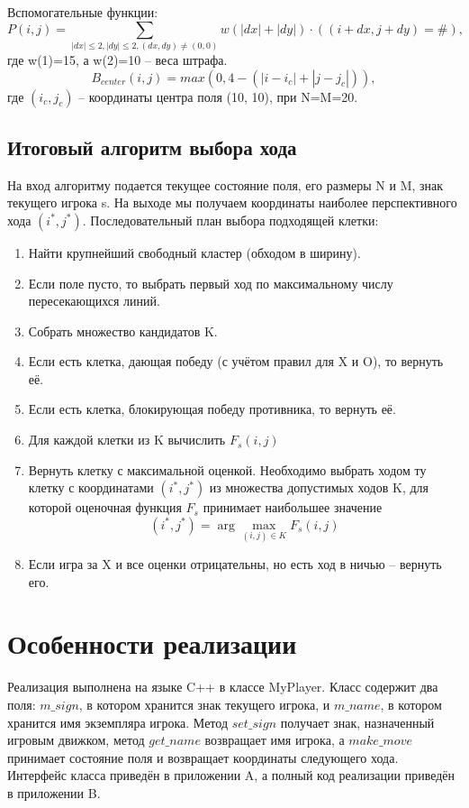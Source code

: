 \documentclass[14pt]{extreport}
\begin{document}
Вспомогательные функции:
\[ P(i, j) = \sum_{|dx| \leq 2, |dy| \leq 2, (dx, dy) \neq (0, 0)}w(|dx| + |dy|) \cdot ((i+dx, j+dy) = \#),\]
где w(1)=15, а w(2)=10 -- веса штрафа.
\[ B_{center}(i, j) = max(0, 4 - (|i-i_c| + |j-j_c|)),\]
где $(i_c, j_c)$ -- координаты центра поля (10, 10), при N=M=20.

\subsection{Итоговый алгоритм выбора хода}
На вход алгоритму подается текущее состояние поля, его размеры N и M, знак текущего игрока s. На выходе мы получаем координаты наиболее перспективного хода $(i^*, j^*)$. Последовательный план выбора подходящей клетки:
\begin{enumerate}
    \item Найти крупнейший свободный кластер (обходом в ширину).
    \item Если поле пусто, то выбрать первый ход по максимальному числу пересекающихся линий.
    \item Собрать множество кандидатов K.
    \item Если есть клетка, дающая победу (с учётом правил для X и O), то вернуть её.
    \item Если есть клетка, блокирующая победу противника, то вернуть её.
    \item Для каждой клетки из K вычислить $F_s(i, j)$
    \item Вернуть клетку с максимальной оценкой. Необходимо выбрать ходом ту клетку с координатами $(i^*, j^*)$ из множества допустимых ходов K, для которой оценочная функция $F_s$ принимает наибольшее значение
        \[(i^*, j^*) = \arg \max_{(i,j) \in K} F_s(i,j)\]
    \item Если игра за X и все оценки отрицательны, но есть ход в ничью -- вернуть его.
\end{enumerate}

\newpage
\section{Особенности реализации}
Реализация выполнена на языке C++ в классе MyPlayer. Класс содержит два поля: $m\_sign$, в котором хранится знак текущего игрока, и $m\_name$, в котором хранится имя экземпляра игрока. Метод $set\_sign$ получает знак, назначенный игровым движком, метод $get\_name$ возвращает имя игрока, а $make\_move$ принимает состояние поля и возвращает координаты следующего хода. Интерфейс класса приведён в приложении A, а полный код реализации приведён в приложении B.
\end{document}
